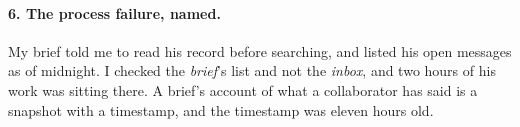 \documentclass[11pt]{article}
\theoremstyle{plain}
\theoremstyle{definition}
\begin{document}
\paragraph{6. The process failure, named.} My brief told me to read his record before searching,
and listed his open messages as of midnight. I checked the \emph{brief}'s list and not the
\emph{inbox}, and two hours of his work was sitting there. A brief's account of what a
collaborator has said is a snapshot with a timestamp, and the timestamp was eleven hours old.
\end{document}

